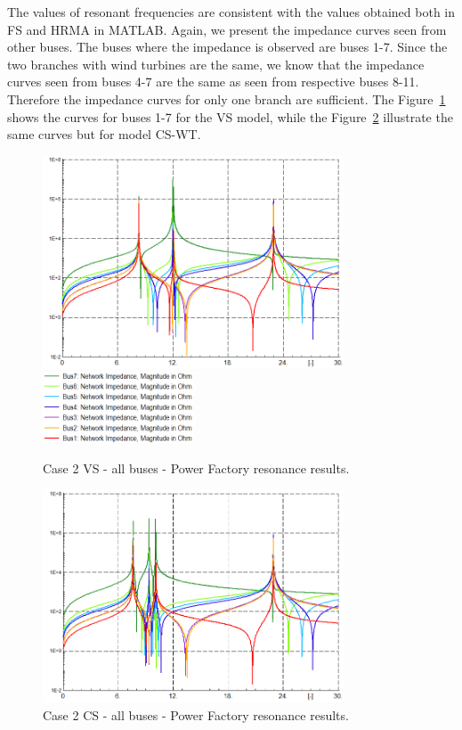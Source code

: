 \documentclass[12pt]{report} %
\begin{document}
The values of resonant frequencies are consistent with the values obtained both in FS and HRMA in MATLAB. Again, we present the impedance curves seen from other buses. The buses where the impedance is observed are buses 1-7. Since the two branches with wind turbines are the same, we know that the impedance curves seen from buses 4-7 are the same as seen from respective buses 8-11. Therefore the impedance curves for only one branch are sufficient. The Figure~\ref{fig:c2pfvs2} shows the curves for buses 1-7 for the VS model, while the Figure~\ref{fig:c2pfcs2} illustrate the same curves but for model CS-WT.

\begin{figure}[htb]
	\centering
	\includegraphics[width=0.8\textwidth]{img/Case2/PF_impAll_VS.PNG}
	\includegraphics[width=0.4\textwidth]{img/Case2/PF_impAllLegend.PNG}
	\caption{Case 2 VS - all buses - Power Factory resonance results.}
  	\label{fig:c2pfvs2}
\end{figure}
\FloatBarrier

\begin{figure}[htb]
	\centering
	\includegraphics[width=0.8\textwidth]{img/Case2/PF_impAll_CS.PNG}
	\caption{Case 2 CS - all buses - Power Factory resonance results.}
  	\label{fig:c2pfcs2}
\end{figure}
\FloatBarrier
\end{document}
